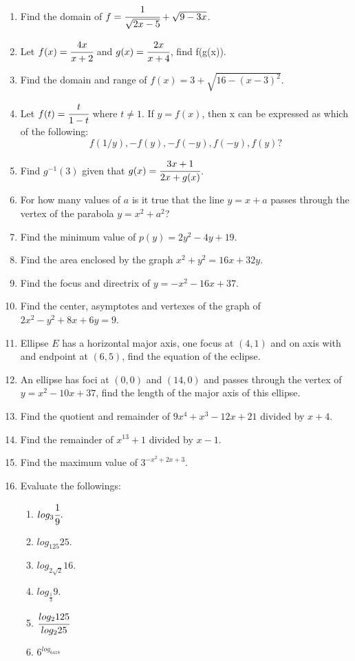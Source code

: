 \documentclass[letterpaper,12pt]{article}
\author{Shawn Ma}
\date{\today}
\begin{document}
\setlength{\parindent}{0pt}

\begin{enumerate}
    \item Find the domain of $f=\cfrac{1}{\sqrt{2x-5}}+\sqrt{9-3x}$.
    \item Let $f(x)=\cfrac{4x}{x+2}$ and $g(x)=\cfrac{2x}{x+4}$, find f(g(x)).
    \item Find the domain and range of $f(x)=3+\sqrt{16-(x-3)^2}$.
    \item Let $f(t)=\cfrac{t}{1-t}$ where $t\neq1$. If $y=f(x)$, then x can be expressed as which of the following:
    \[f(1/y), -f(y), -f(-y), f(-y), f(y)?\]
    \item Find $g^{-1}(3)$ given that $g(x)=\cfrac{3x+1}{2x+g(x)}$.
    \item For how many values of $a$ is it true that the line $y=x+a$ passes through the vertex of the parabola $y=x^2+a^2$?
    \item Find the minimum value of $p(y)=2y^2-4y+19$.
    \item Find the area enclosed by the graph $x^2+y^2=16x+32y$.
    \item Find the focus and directrix of $y=-x^2-16x+37$.
    \item Find the center, asymptotes and vertexes of the graph of $2x^2-y^2+8x+6y=9$.
    \item Ellipse $E$ has a horizontal major axis, one focus at $(4,1)$ and on axis with and endpoint at $(6,5)$, find the equation of the eclipse.
    \item An ellipse has foci at $(0,0)$ and $(14,0)$ and passes through the vertex
    of $y=x^2-10x+37$, find the length of the major axis of this ellipse.
    \item Find the quotient and remainder of $9x^4+x^3-12x+21$ divided by $x+4$.
    \item Find the remainder of $x^{13}+1$ divided by $x-1$.
    \item Find the maximum value of $3^{-x^2+2x+3}$.
    \item Evaluate the followings:
    \begin{enumerate}
        \item $log_3\cfrac{1}{9}$.
        \item $log_{125}25$.
        \item $log_{2\sqrt{2}}16$.
        \item $log_{\frac{1}{3}}9$.
        \item $\cfrac{log_2125}{log_225}$
        \item $6^{log_6418}$

\end{enumerate}
\end{enumerate}
\end{document}
